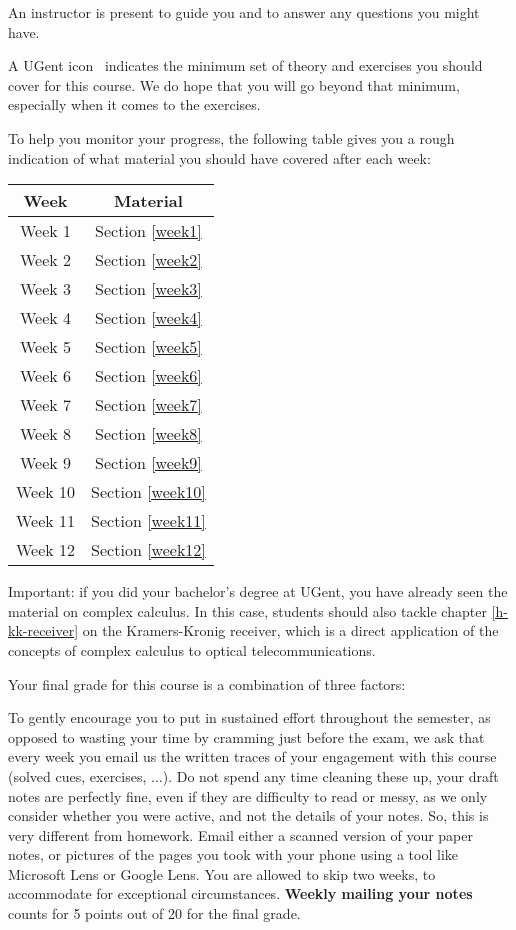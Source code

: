 An instructor is present to guide you and to answer any questions you might have.

A UGent icon \iconoffset\ugent\, indicates the minimum set of theory and exercises you should cover for this course. We do hope that you will go beyond that minimum, especially when it comes to the exercises.

To help you monitor your progress, the following table gives you a rough indication of what material you should have covered after each week:

\begin{center}
\begin{tabular}{ |c|c| } 
 \hline
  \textbf{Week} & \textbf{Material} \\
  \hline
 Week 1 & Section \ref{week1} \\ 
 Week 2 & Section \ref{week2} \\
 Week 3 & Section \ref{week3} \\
 Week 4 & Section \ref{week4} \\
 Week 5 & Section \ref{week5} \\
 Week 6 & Section \ref{week6} \\ 
 Week 7 & Section \ref{week7} \\
 Week 8 & Section \ref{week8} \\
 Week 9 & Section \ref{week9} \\
 Week 10 & Section \ref{week10}  \\
 Week 11 & Section \ref{week11} \\ 
 Week 12 & Section \ref{week12} \\
 \hline
\end{tabular}
\end{center}

Important: if you did your bachelor's degree at UGent, you have already seen the material on complex calculus. In this case, students should also tackle chapter \ref{h-kk-receiver} on the Kramers-Kronig receiver, which is a direct application of the concepts of complex calculus to optical telecommunications.

Your final grade for this course is a combination of three factors:

To gently encourage you to put in sustained effort throughout the semester, as opposed to wasting your time by cramming just before the exam, we ask that every week you email us the written traces of your engagement with this course (solved cues, exercises, ...). Do not spend any time cleaning these up, your draft notes are perfectly fine, even if they are difficulty to read or messy, as we only consider whether you were active, and not the details of your notes. So, this is very different from homework. Email either a scanned version of your paper notes, or pictures of the pages you took with your phone using a tool like Microsoft Lens or Google Lens. You are allowed to skip two weeks, to accommodate for exceptional circumstances. \textbf{Weekly mailing your notes} counts for 5 points out of 20 for the final grade.

